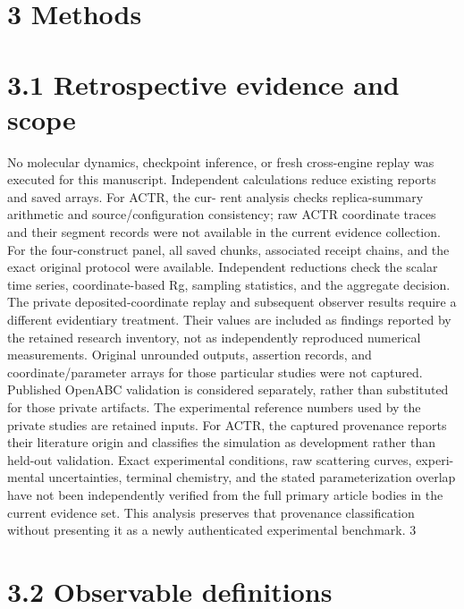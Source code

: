 \documentclass[11pt]{article}
\begin{document}
\section*{3 Methods}


\section*{3.1 Retrospective evidence and scope}

No molecular dynamics, checkpoint inference, or fresh cross-engine replay was executed for this
manuscript. Independent calculations reduce existing reports and saved arrays. For ACTR, the cur-
rent analysis checks replica-summary arithmetic and source/configuration consistency; raw ACTR
coordinate traces and their segment records were not available in the current evidence collection.
For the four-construct panel, all saved chunks, associated receipt chains, and the exact original
protocol were available. Independent reductions check the scalar time series, coordinate-based Rg,
sampling statistics, and the aggregate decision.
The private deposited-coordinate replay and subsequent observer results require a different
evidentiary treatment. Their values are included as findings reported by the retained research
inventory, not as independently reproduced numerical measurements. Original unrounded outputs,
assertion records, and coordinate/parameter arrays for those particular studies were not captured.
Published OpenABC validation is considered separately, rather than substituted for those private
artifacts.
The experimental reference numbers used by the private studies are retained inputs. For ACTR,
the captured provenance reports their literature origin and classifies the simulation as development
rather than held-out validation. Exact experimental conditions, raw scattering curves, experi-
mental uncertainties, terminal chemistry, and the stated parameterization overlap have not been
independently verified from the full primary article bodies in the current evidence set. This analysis
preserves that provenance classification without presenting it as a newly authenticated experimental
benchmark.
3


\section*{3.2 Observable definitions}
\end{document}
